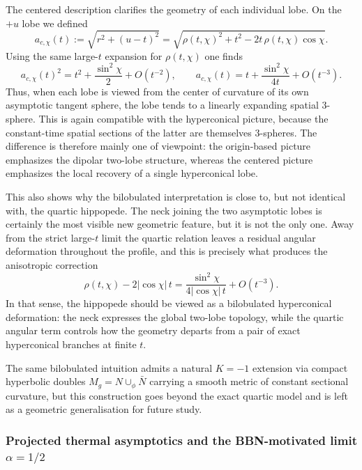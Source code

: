 \documentclass[preprint,12pt]{elsarticle}
\begin{document}
The centered description clarifies the geometry of each individual lobe. On the $+u$ lobe we defined
\begin{equation}
a_{c,\chi}(t):=\sqrt{r^2+(u-t)^2}
=\sqrt{\rho(t,\chi)^2+t^2-2t\,\rho(t,\chi)\cos\chi}.
\end{equation}
Using the same large-$t$ expansion for $\rho(t,\chi)$ one finds
\begin{equation}
a_{c,\chi}(t)^2
=t^2+\frac{\sin^2\chi}{2}+O(t^{-2}),
\qquad
a_{c,\chi}(t)
=t+\frac{\sin^2\chi}{4t}+O(t^{-3}).
\end{equation}
Thus, when each lobe is viewed from the center of curvature of its own asymptotic tangent sphere, the lobe tends to a linearly expanding spatial $3$-sphere. This is again compatible with the hyperconical picture, because the constant-time spatial sections of the latter are themselves $3$-spheres. The difference is therefore mainly one of viewpoint: the origin-based picture emphasizes the dipolar two-lobe structure, whereas the centered picture emphasizes the local recovery of a single hyperconical lobe.

This also shows why the bilobulated interpretation is close to, but not identical with, the quartic hippopede. The neck joining the two asymptotic lobes is certainly the most visible new geometric feature, but it is not the only one. Away from the strict large-$t$ limit the quartic relation leaves a residual angular deformation throughout the profile, and this is precisely what produces the anisotropic correction
\begin{equation}
\rho(t,\chi)-2|{\cos\chi}|\,t
=\frac{\sin^2\chi}{4|{\cos\chi}|\,t}+O(t^{-3}).
\end{equation}
In that sense, the hippopede should be viewed as a bilobulated hyperconical deformation: the neck expresses the global two-lobe topology, while the quartic angular term controls how the geometry departs from a pair of exact hyperconical branches at finite $t$.

The same bilobulated intuition admits a natural $K=-1$ extension via compact hyperbolic doubles $M_g = N\cup_\phi\bar N$ carrying a smooth metric of constant sectional curvature, but this construction goes beyond the exact quartic model and is left as a geometric generalisation for future study.


\subsubsection*{Projected thermal asymptotics and the BBN-motivated limit $\alpha=1/2$}
\end{document}
